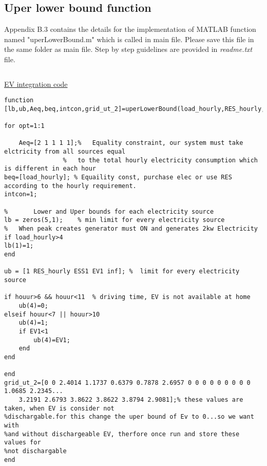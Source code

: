\newpage
\subsection{Uper lower bound function}
Appendix B.3 contains the details for the implementation of MATLAB function named "uperLowerBound.m" which is called in main file. Please save this file in the same folder as main file. Step by step guidelines are provided in \textit{readme.txt} file.\par

\begin{linenumbers}
\begin{lstlisting}

\end{lstlisting}
\hypertarget{ev_code}{}
\hyperlink{ev_text}{EV integration code}
\begin{lstlisting}
function [lb,ub,Aeq,beq,intcon,grid_ut_2]=uperLowerBound(load_hourly,RES_hourly,ESS1,EV1,houur)

for opt=1:1

    Aeq=[2 1 1 1 1];%   Equality constraint, our system must take elctricity from all sources equal
                %   to the total hourly electricity consumption which is different in each hour
beq=[load_hourly]; % Equaility const, purchase elec or use RES according to the hourly requirement.
intcon=1;

%       Lower and Uper bounds for each electricity source
lb = zeros(5,1);    % min limit for every electricity source
%   When peak creates generator must ON and generates 2kw Electricity
if load_hourly>4
lb(1)=1;
end

ub = [1 RES_hourly ESS1 EV1 inf]; %  limit for every electricity source

if houur>6 && houur<11  % driving time, EV is not available at home
    ub(4)=0;
elseif houur<7 || houur>10
    ub(4)=1;
    if EV1<1
        ub(4)=EV1;
    end
end

end
grid_ut_2=[0 0 2.4014 1.1737 0.6379 0.7878 2.6957 0 0 0 0 0 0 0 0 0 1.0685 2.2345...
    3.2191 2.6793 3.8622 3.8622 3.8794 2.9081];% these values are taken, when EV is consider not
%dischargable.for this change the uper bound of Ev to 0...so we want with
%and without dischargeable EV, therfore once run and store these values for
%not dischargable
end
\end{lstlisting}
\end{linenumbers} 
